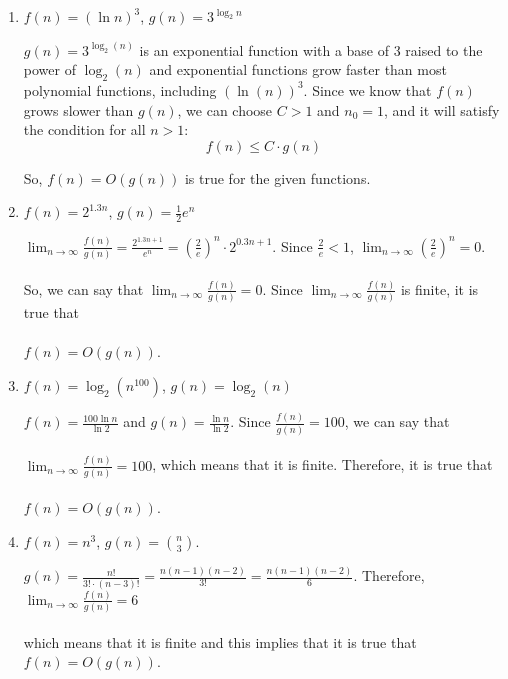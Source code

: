 \documentclass[11pt]{exam}
\begin{document}
\begin{enumerate}
\begin{enumerate}
	  \item 
   $f(n) = (\ln n)^3$, $g(n) = 3^{\log_2 n}$
	  
	    \begin{solution}
\(g(n) = 3^{\log_2(n)}\) is an exponential function with a base of 3 raised to the power of \(\log_2(n)\) and exponential functions grow faster than most polynomial functions, including \((\ln(n))^3\). Since we know that \(f(n)\) grows slower than \(g(n)\), we can choose \(C > 1\) and \(n_0 = 1\), and it will satisfy the condition for all \(n > 1\):
\[
f(n) \leq C \cdot g(n)
\]

So, \(f(n) = O(g(n))\) is true for the given functions.
     	\end{solution}

	  \item   $f(n) = 2^{1.3n}$, $g(n) = \frac{1}{2}e^n$
	  
	    \begin{solution}
$\lim_{n \to \infty} \frac{f(n)}{g(n)} = \frac{2^{1.3n+1}}{e^n} = (\frac{2}{e})^n \cdot 2^{0.3n+1}$.
Since $\frac{2}{e} < 1$, $\lim_{n \to \infty} (\frac{2}{e})^n = 0$.\\\\
So, we can say that $\lim_{n \to \infty} \frac{f(n)}{g(n)} = 0$. Since $\lim_{n \to \infty} \frac{f(n)}{g(n)}$ is finite, it is true that\\\\ $f(n) = O(g(n))$.
        \end{solution}

	  \item $f(n) = \log_2(n^{100})$, $g(n) = \log_2(n)$
	  
	    \begin{solution}
	 $f(n)=\frac{100 \ln n }{\ln 2}$ and $g(n)=\frac{\ln n}{\ln 2}$. Since $\frac{f(n)}{g(n)}=100$, we can say that \\\\
$\lim_{n \to \infty} \frac{f(n)}{g(n)} = 100$, which means that it is finite. Therefore, it is true that \\\\$f(n) = O(g(n))$.
        \end{solution}

        \item 
        $f(n) = n^3$, $g(n) = \binom{n}{3}$.
        \begin{solution}
$g(n)=\frac{n!}{3! \cdot (n-3)!} = \frac{n(n-1)(n-2)}{3!} = \frac{n(n-1)(n-2)}{6}$. Therefore, $\lim_{n \to \infty} \frac{f(n)}{g(n)} = 6$\\\\ which means that it is finite and this implies that it is true that $f(n) = O(g(n))$.
        \end{solution}


\end{enumerate}
\end{enumerate}
\end{document}
